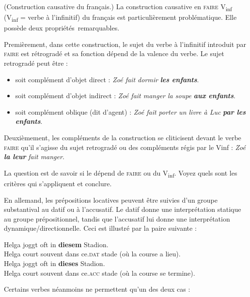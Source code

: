 {     (Construction causative du français.) La construction causative en \textsc{faire} V\textsubscript{inf}
     (V\textsubscript{inf} = verbe à l’infinitif) du français est particulièrement problématique. Elle possède deux propriétés~remarquables.

    Premièrement, dans cette construction, le sujet du verbe à l’infinitif introduit par \textsc{faire} est rétrogradé et sa fonction dépend de la valence du verbe. Le sujet retrogradé peut être :
    \begin{itemize}
    \item  soit complément d’objet direct : \textit{Zoé fait dormir} \textbf{\textit{les enfants}}.
    \item  soit complément d’objet indirect : \textit{Zoé fait manger la soupe} \textbf{\textit{aux enfants}}.
    \item  soit complément oblique (dit d’agent) : \textit{Zoé fait porter un livre à Luc} \textbf{\textit{par les enfants}}.
    \end{itemize}
    Deuxièmement, les compléments de la construction se cliticisent devant le verbe \textsc{faire} qu’il s’agisse du sujet retrogradé ou des compléments régis par le Vinf : \textit{Zoé} \textbf{\textit{la leur}} \textit{fait manger}.

    La question est de savoir si le  dépend de \textsc{faire} ou du V\textsubscript{inf}. Voyez quels sont les critères qui s’appliquent et conclure.

     En allemand, les prépositions locatives peuvent être suivies d’un groupe substantival au datif ou à l’accusatif. Le datif donne une interprétation statique au groupe prépositionnel, tandis que l’accusatif lui donne une interprétation dynamique/directionnelle. Ceci est illustré par la paire suivante :

    \begin{exe}
    \gll   Helga joggt oft in \textbf{diesem} Stadion.\\
    Helga court souvent dans ce.\textsc{dat} stade (où la course a lieu).\\
    \gll   Helga joggt oft in \textbf{dieses} Stadion.\\
    Helga court souvent dans ce.\textsc{acc} stade (où la course se termine).\\
    \end{exe}
    
   \noindent Certains verbes néanmoins ne permettent qu’un des deux cas :

}
